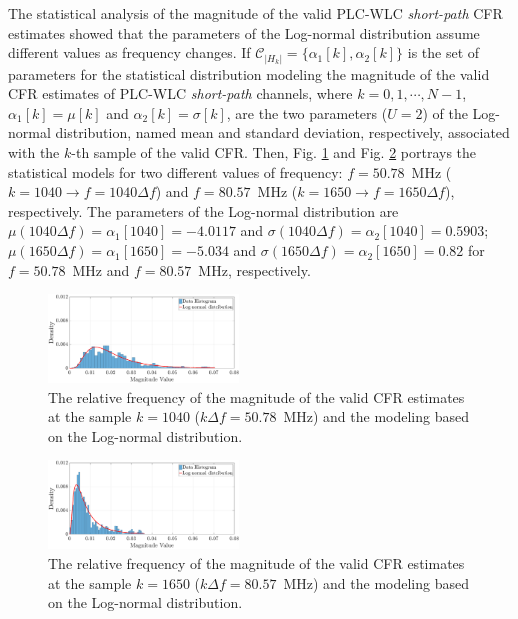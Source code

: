 \documentclass[journal]{IEEEtran}
\begin{document}
The statistical analysis of the magnitude of the valid \ac{PLC}-\ac{WLC} \textit{short-path} \ac{CFR} estimates showed that the parameters of the Log-normal distribution assume different values as frequency changes. If $\mathcal{C}_{|H_k|} = \{\alpha_1[k],\alpha_2[k]\}$ is the set of parameters for the statistical distribution modeling the magnitude of the valid \ac{CFR} estimates of \ac{PLC}-\ac{WLC} \textit{short-path} channels, where $k=0,1,\cdots,N-1$,  $\alpha_1[k] = \mu[k]$ and $\alpha_2[k] = \sigma[k]$, are the two parameters ($U=2$) of the Log-normal distribution, named mean and standard deviation, respectively, associated with the $k$-th sample of the valid \ac{CFR}. Then, Fig. \ref{mag_examplesW} and Fig. \ref{mag_example2sW} portrays the statistical models for two different values of frequency: $f=50.78$~MHz ($k=1040 \rightarrow f = 1040\Delta f$) and $f=80.57$~MHz ($k=1650 \rightarrow f = 1650\Delta f$), respectively. The parameters of the Log-normal distribution are  $\mu(1040 \Delta f) = \alpha_1[1040]=-4.0117$ and $\sigma( 1040 \Delta f) = \alpha_2[1040] = 0.5903$; $\mu(1650 \Delta f) = \alpha_1[1650] = -5.034$ and $\sigma( 1650 \Delta f) = \alpha_2[1650]=0.82$ for $f=50.78$~MHz and $f=80.57$~MHz, respectively.

\begin{figure}[h!]
	\centering
	\includegraphics[width=0.45\textwidth]{images/Mag_histsW_2.eps}
	\caption{The relative frequency of the magnitude of the valid CFR estimates at the sample $k = 1040$ ($k\Delta f= 50.78$~MHz) and the modeling based on the Log-normal distribution.}
	\label{mag_examplesW}
\end{figure}

\begin{figure}[h!]
	\centering
	\includegraphics[width=0.45\textwidth]{images/Mag_hist2sW_2.eps}
	\caption{ The relative frequency of the magnitude of the valid CFR estimates at the sample $k = 1650$ ($k\Delta f= 80.57$~MHz) and the modeling based on the Log-normal distribution.}
	\label{mag_example2sW}
\end{figure}
\end{document}
